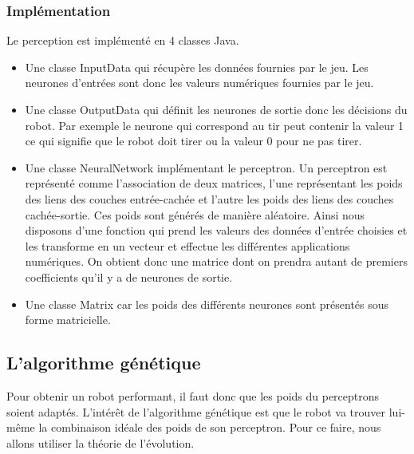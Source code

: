 \documentclass[12pt]{article}
\begin{document}
\subsubsection{Implémentation}
Le perception est implémenté en 4 classes Java.
\begin{itemize}
\item Une classe InputData qui récupère les données fournies par le jeu. Les neurones d'entrées sont donc les valeurs numériques fournies par le jeu.
\item Une classe OutputData qui définit les neurones de sortie donc les décisions du robot. Par exemple le neurone qui correspond au tir peut contenir la valeur 1 ce qui signifie que le robot doit tirer ou la valeur 0 pour ne pas tirer.
\item Une classe NeuralNetwork implémentant le perceptron. Un perceptron est représenté comme l'association de deux matrices, l'une représentant les poids des liens des couches
entrée-cachée et l'autre les poids des liens des couches cachée-sortie. Ces poids sont générés de manière aléatoire.
Ainsi nous disposons d'une fonction qui prend les valeurs des données d'entrée
choisies et les transforme en un vecteur et effectue les différentes applications
numériques. On obtient donc une matrice dont on prendra autant de premiers coefficients qu'il y a de neurones de sortie.
\item Une classe Matrix car les poids des différents neurones sont présentés sous forme matricielle.
\end{itemize}

\subsection{L'algorithme génétique}
Pour obtenir un robot performant, il faut donc que les poids du perceptrons soient adaptés. L'intérêt de l'algorithme génétique est que le robot va trouver lui-même la combinaison idéale des poids de son perceptron. Pour ce faire, nous allons utiliser la théorie de l'évolution.
\end{document}
